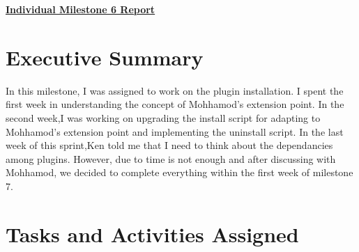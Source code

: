 \documentclass{article}
\begin{document}
\pagestyle{headings}

\begin{center}
{\LARGE\textbf{\underline{{Individual Milestone 6 Report}}}}
\end{center}

\section*{Executive Summary}
In this milestone, I was assigned to work on the plugin installation. I spent the first week in understanding the concept of Mohhamod's extension point. In the second week,I was working on upgrading the install script for adapting to Mohhamod's extension point and implementing the uninstall script. In the last week of this sprint,Ken told me that I need to think about the dependancies among plugins. However, due to time is not enough and after discussing with Mohhamod, we decided to complete everything within the first week of milestone 7.


\section*{Tasks and Activities Assigned}
\end{document}
